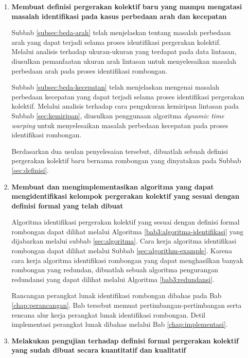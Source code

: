 \begin{enumerate}
    \item \textbf{Membuat definisi pergerakan kolektif baru yang mampu mengatasi masalah identifikasi pada kasus perbedaan arah dan kecepatan}
    
    Subbab \ref{subsec:beda-arah} telah menjelaskan tentang masalah perbedaan arah yang dapat terjadi selama proses identifikasi pergerakan kolektif. Melalui analisis terhadap ukuran-ukuran yang terdapat pada data lintasan, diusulkan pemanfaatan ukuran arah lintasan untuk menyelesaikan masalah perbedaan arah pada proses identifikasi rombongan.
    
    Subbab \ref{subsec:beda-kecepatan} telah menjelaskan mengenai masalah perbedaan kecepatan yang dapat terjadi selama proses identifikasi pergerakan kolektif. Melalui analisis terhadap cara pengukuran kemiripan lintasan pada Subbab \ref{sec:kemiripan}, diusulkan penggunaan algoritma \textit{dynamic time warping} untuk menyelesaikan masalah perbedaan kecepatan pada proses identifikasi rombongan.
    
    Berdasarkan dua usulan penyelesaian tersebut, dibuatlah sebuah definisi pergerakan kolektif baru bernama rombongan yang dinyatakan pada Subbab \ref{sec:definisi}.
    
    \item \textbf{Membuat dan mengimplementasikan algoritma yang dapat mengidentifikasi kelompok pergerakan kolektif yang sesuai dengan definisi formal yang telah dibuat}
    
    Algoritma identifikasi pergerakan kolektif yang sesuai dengan definisi formal rombongan dapat dilihat melalui Algoritma \ref{bab3:algoritma-identifikasi} yang dijabarkan melalui subbab \ref{sec:algoritma}. Cara kerja algoritma identifikasi rombongan dapat dilihat melalui Subbab \ref{sec:algorithm-example}. Karena cara kerja algoritma identifikasi rombongan yang dapat menghasilkan banyak rombongan yang redundan, dibuatlah sebuah algoritma pengurangan redundansi yang dapat dilihat melalui Algoritma \ref{bab3:redundansi}.
    
    Rancangan perangkat lunak identifikasi rombongan dibahas pada Bab \ref{chap:perancangan}. Bab tersebut memuat pertimbangan-pertimbangan serta rencana alur kerja perangkat lunak identifikasi rombongan. Detil implementasi perangkat lunak dibahas melalui Bab \ref{chap:implementasi}.
    
    \item \textbf{Melakukan pengujian terhadap definisi formal pergerakan kolektif yang sudah dibuat secara kuantitatif dan kualitatif}
    

\end{enumerate}
